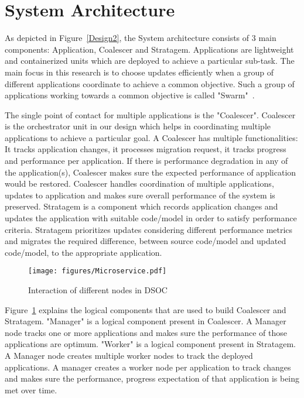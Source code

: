 \section{System Architecture}
As depicted in Figure~\ref{Design2}, the System architecture consists of 3 main components: Application, Coalescer and Stratagem. Applications are lightweight and containerized units which are deployed to achieve a particular sub-task. The main focus in this research is to choose updates efficiently when a group of different applications coordinate to achieve a common objective. Such a group of applications working towards a common objective is called "Swarm"~\cite{swarm_docker}. 


The single point of contact for multiple applications is the "Coalescer". Coalescer is the orchestrator unit in our design which helps in coordinating multiple applications to achieve a particular goal. A Coalescer has multiple functionalities: It tracks application changes, it processes migration request, it tracks progress and performance per application. If there is performance degradation in any of the application(s), Coalescer makes sure the expected performance of application would be restored. Coalescer handles coordination of multiple applications, updates to application and makes sure overall performance of the system is preserved. Stratagem is a component which records application changes and updates the application with suitable code/model in order to satisfy performance criteria. Stratagem prioritizes updates considering different performance metrics and migrates the required difference, between source code/model and updated code/model, to the appropriate application.

\begin{figure}
    \centering
    \texttt{[image: figures/Microservice.pdf]}
    \caption{Interaction of different nodes in DSOC}
    \label{figX}
\end{figure}
Figure~\ref{figX} explains the logical components that are used to build Coalescer and Stratagem. "Manager" is a logical component present in Coalescer. A Manager node tracks one or more applications and makes sure the performance of those applications are optimum. "Worker" is a logical component present in Stratagem. A Manager node creates multiple worker nodes to track the deployed applications. A manager creates a worker node per application to track changes and makes sure the performance, progress expectation of that application is being met over time.


